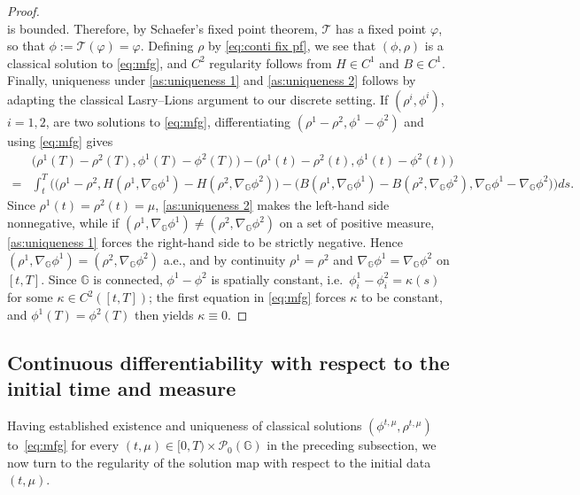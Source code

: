 \documentclass[10pt]{article}
\numberwithin{equation}{section}
\newcommand{\cP}{ \mathcal{P}}
\newcommand{\bG}{\mathbb G}
\def\G{\mathbb{G}}
\begin{document}
\begin{proof}
\begin{equation}
\end{equation}
is bounded. Therefore, by Schaefer's fixed point theorem, $\mathcal T$ has a fixed point $\varphi$, so that $\phi:=\mathcal T(\varphi)=\varphi$. Defining $\rho$ by \eqref{eq:conti fix pf}, we see that $(\phi,\rho)$ is a classical solution to \eqref{eq:mfg}, and $C^{2}$ regularity follows from $H\in C^1$ and $B\in C^1$. Finally, uniqueness under \eqref{as:uniqueness 1} and \eqref{as:uniqueness 2} follows by adapting the classical Lasry--Lions argument \cite{LL2} to our discrete setting. If $(\rho^i, \phi^i)$, $i=1,2$, are two solutions to \eqref{eq:mfg}, differentiating $(\rho^1-\rho^2, \phi^1-\phi^2)$ and using \eqref{eq:mfg} gives
\begin{align*}
& \Big(\rho^1(T)-\rho^2(T), \phi^1(T)-\phi^2(T) \Big)- \Big(\rho^1(t)-\rho^2(t), \phi^1(t)-\phi^2(t) \Big)\\
=& \int_t^T \Big( \big(\rho^1-\rho^2, H(\rho^1, \nabla_{\G} \phi^1)-H(\rho^2, \nabla_{\G} \phi^2)\big)-
\big(B(\rho^1, \nabla_{\G} \phi^1)-B(\rho^2, \nabla_{\G} \phi^2),  \nabla_{\G} \phi^1- \nabla_{\G} \phi^2\big)
\Big)ds.
\end{align*}
Since $\rho^1(t)=\rho^2(t)=\mu$, \eqref{as:uniqueness 2} makes the left-hand side nonnegative, while if $(\rho^1,\nabla_\G\phi^1)\not=(\rho^2,\nabla_\G\phi^2)$ on a set of positive measure, \eqref{as:uniqueness 1} forces the right-hand side to be strictly negative. Hence $(\rho^1, \nabla_{\G} \phi^1)=(\rho^2, \nabla_{\G} \phi^2)$ a.e., and by continuity $\rho^1=\rho^2$ and $\nabla_{\G} \phi^1=\nabla_{\G} \phi^2$ on $[t,T]$. Since $\bG$ is connected, $\phi^1-\phi^2$ is spatially constant, i.e.\ $\phi^1_i-\phi^2_i=\kappa(s)$ for some $\kappa\in C^2([t,T])$; the first equation in \eqref{eq:mfg} forces $\kappa$ to be constant, and $\phi^1(T)=\phi^2(T)$ then yields $\kappa\equiv 0$.
\end{proof}

\subsection{Continuous differentiability with respect to the initial time and measure}
Having established existence and uniqueness of classical solutions $(\phi^{t,\mu},\rho^{t,\mu})$ to~\eqref{eq:mfg} for every $(t,\mu)\in[0,T)\times\cP_0(\G)$ in the preceding subsection, we now turn to the regularity of the solution map with respect to the initial data $(t,\mu)$.
\end{document}

